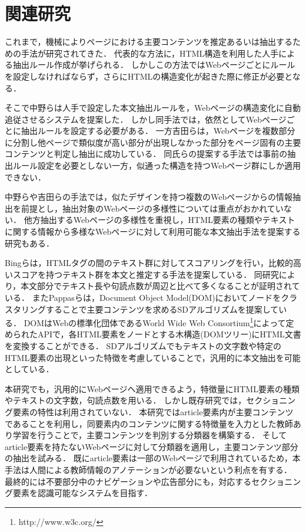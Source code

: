 \documentclass[a4paper,10pt,twocolumn]{jsarticle}
\begin{document}
\section{関連研究}

これまで，機械によりページにおける主要コンテンツを推定あるいは抽出するための手法が研究されてきた．
代表的な方法に，HTML構造を利用した人手による抽出ルール作成が挙げられる．
しかしこの方法ではWebページごとにルールを設定しなければならず，さらにHTMLの構造変化が起きた際に修正が必要となる．

そこで中野ら\cite{nakano}は人手で設定した本文抽出ルールを，Webページの構造変化に自動追従させるシステムを提案した．
しかし同手法では，依然としてWebページごとに抽出ルールを設定する必要がある．
一方吉田ら\cite{yoshida}は，Webページを複数部分に分割し他ページで類似度が高い部分が出現しなかった部分をページ固有の主要コンテンツと判定し抽出に成功している．
同氏らの提案する手法では事前の抽出ルール設定を必要としない一方，似通った構造を持つWebページ群にしか適用できない．

中野ら\cite{nakano}や吉田ら\cite{yoshida}の手法では，似たデザインを持つ複数のWebページからの情報抽出を前提とし，抽出対象のWebページの多様性については重点がおかれていない．
他方抽出するWebページの多様性を重視し，HTML要素の種類やテキストに関する情報から多様なWebページに対して利用可能な本文抽出手法を提案する研究もある．

Bingら\cite{lbing}は，HTMLタグの間のテキスト群に対してスコアリングを行い，比較的高いスコアを持つテキスト群を本文と推定する手法を提案している．
同研究により，本文部分でテキスト長や句読点数が周辺と比べて多くなることが証明されている．
またPappasら\cite{pappas}は，Document Object Model(DOM)においてノードをクラスタリングすることで主要コンテンツを求めるSDアルゴリズムを提案している．
DOMはWebの標準化団体であるWorld Wide Web Consortium\footnote{http://www.w3c.org/}によって定められたAPIで，各HTML要素をノードとする木構造(DOMツリー)にHTML文書を変換することができる．
SDアルゴリズムでもテキストの文字数や特定のHTML要素の出現といった特徴を考慮していることで，汎用的に本文抽出を可能としている．

本研究でも，汎用的にWebページへ適用できるよう，特徴量にHTML要素の種類やテキストの文字数，句読点数を用いる．
しかし既存研究では，セクショニング要素の特性は利用されていない．
本研究ではarticle要素内が主要コンテンツであることを利用し，同要素内のコンテンツに関する特徴量を入力とした教師あり学習を行うことで，主要コンテンツを判別する分類器を構築する．
そしてarticle要素を持たないWebページに対して分類器を適用し，主要コンテンツ部分の抽出を試みる．
既にarticle要素は一部のWebページで利用されているため，本手法は人間による教師情報のアノテーションが必要ないという利点を有する．
最終的には不要部分中のナビゲーションや広告部分にも，対応するセクショニング要素を認識可能なシステムを目指す．
\end{document}

